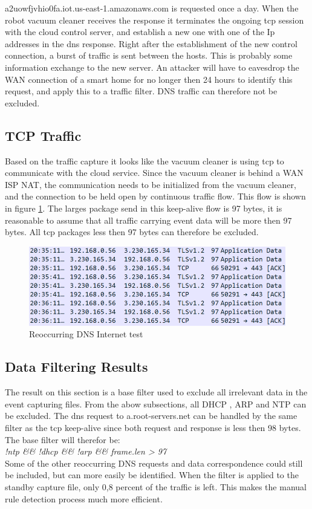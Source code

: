 a2uowfjvhio0fa.iot.us-east-1.amazonaws.com is requested once a day. When the robot vacuum cleaner receives the response it terminates the ongoing tcp session with the cloud control server, and establish a new one with one of the Ip addresses in the dns response. Right after the establishment of the new control connection, a burst of traffic is sent between the hosts. This is probably some information exchange to the new server. An attacker will have to eavesdrop the WAN connection of a smart home for no longer then 24 hours to identify this request, and apply this to a traffic filter. DNS traffic can therefore not be excluded. 

\subsection{TCP Traffic}
Based on the traffic capture it looks like the vacuum cleaner is using tcp to communicate with the cloud service. Since the vacuum cleaner is behind a WAN ISP NAT, the communication needs to be initialized from the vacuum cleaner, and the connection to be held open by continuous traffic flow. This flow is shown in figure \ref{fig:tcp_keep-alive}. The larges package send in this keep-alive flow is 97 bytes, it is reasonable to assume that all traffic carrying event data will be more then 97 bytes. All tcp packages less then 97 bytes can therefore be excluded. 

\begin{figure}[H]
    \centering
    \includegraphics[width=\textwidth]{figures/tcp_keep-alive.png}
    \caption{Reoccurring DNS Internet test}
    \label{fig:tcp_keep-alive}
\end{figure}

\subsection{Data Filtering Results}
The result on this section is a base filter used to exclude all irrelevant data in the event capturing files. From the abow subsections, all DHCP , ARP and NTP can be excluded. The dns request to a.root-servers.net can be handled by the same filter as the tcp keep-alive since both request and response is less then 98 bytes. The base filter will therefor be:
\\
\textit{!ntp \&\& !dhcp \&\& !arp \&\& frame.len > 97}
\\
Some of the other reoccurring DNS requests and data correspondence could still be included, but can more easily be identified. When the filter is applied to the standby capture file, only 0,8 percent of the traffic is left. This makes the manual rule detection process much more efficient. 

